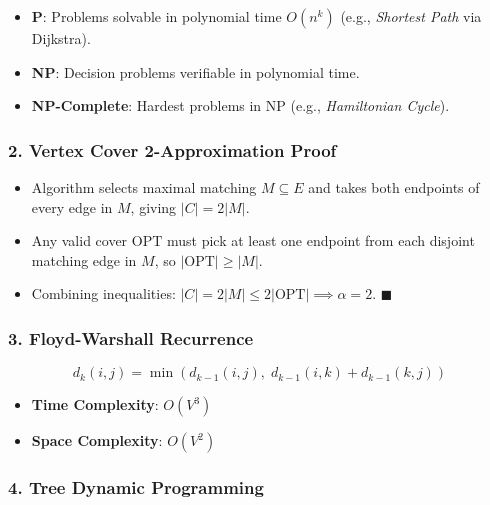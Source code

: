 \documentclass[
]{book}
\providecommand{\tightlist}{%
  \setlength{\itemsep}{0pt}\setlength{\parskip}{0pt}}
\theoremstyle{definition}
\theoremstyle{definition}
\theoremstyle{definition}
\theoremstyle{definition}
\theoremstyle{remark}
\begin{document}
\begin{itemize}
\tightlist
\item
  \textbf{P}: Problems solvable in polynomial time \(O(n^k)\) (e.g., \emph{Shortest Path} via Dijkstra).
\item
  \textbf{NP}: Decision problems verifiable in polynomial time.
\item
  \textbf{NP-Complete}: Hardest problems in NP (e.g., \emph{Hamiltonian Cycle}).
\end{itemize}

\subsubsection{2. Vertex Cover 2-Approximation Proof}\label{vertex-cover-2-approximation-proof}

\begin{itemize}
\tightlist
\item
  Algorithm selects maximal matching \(M \subseteq E\) and takes both endpoints of every edge in \(M\), giving \(\vert{}C\vert{} = 2\vert{}M\vert{}\).
\item
  Any valid cover \(\text{OPT}\) must pick at least one endpoint from each disjoint matching edge in \(M\), so \(\vert{}\text{OPT}\vert{} \ge \vert{}M\vert{}\).
\item
  Combining inequalities: \(\vert{}C\vert{} = 2\vert{}M\vert{} \le 2\vert{}\text{OPT}\vert{} \implies \alpha = 2\). \(\blacksquare\)
\end{itemize}

\subsubsection{3. Floyd-Warshall Recurrence}\label{floyd-warshall-recurrence}

\[d_k(i, j) = \min \left( d_{k-1}(i, j), \; d_{k-1}(i, k) + d_{k-1}(k, j) \right)\]

\begin{itemize}
\tightlist
\item
  \textbf{Time Complexity}: \(O(V^3)\)
\item
  \textbf{Space Complexity}: \(O(V^2)\)
\end{itemize}

\subsubsection{4. Tree Dynamic Programming}\label{tree-dynamic-programming-1}
\end{document}
